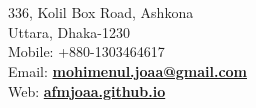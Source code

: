 
\hspace*{0pt}\hfill    \\
\hspace*{0pt}\hfill    \\
336, Kolil Box Road, Ashkona \\
Uttara, Dhaka-1230 \\
Mobile: +880-1303464617 \\
Email: \textbf{\href{mailto:mohimenul.joaa@gmail.com}{mohimenul.joaa@gmail.com}} \\
Web: \textbf{\href{https://afmjoaa.github.io/}{afmjoaa.github.io}}
\vspace{0.2cm}
